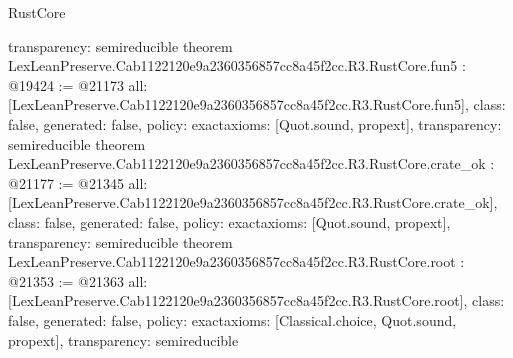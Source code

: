 \begin{lexlean}{RustCore}
\begin{coremodule}
{  transparency: semireducible
}
theorem LexLeanPreserve.Cab1122120e9a2360356857cc8a45f2cc.R3.RustCore.fun5 : @19424 := @21173 {
  all: [LexLeanPreserve.Cab1122120e9a2360356857cc8a45f2cc.R3.RustCore.fun5],
  class: false,
  generated: false,
  policy: exact{axioms: [Quot.sound, propext]},
  transparency: semireducible
}
theorem LexLeanPreserve.Cab1122120e9a2360356857cc8a45f2cc.R3.RustCore.crate_ok : @21177 := @21345 {
  all: [LexLeanPreserve.Cab1122120e9a2360356857cc8a45f2cc.R3.RustCore.crate_ok],
  class: false,
  generated: false,
  policy: exact{axioms: [Quot.sound, propext]},
  transparency: semireducible
}
theorem LexLeanPreserve.Cab1122120e9a2360356857cc8a45f2cc.R3.RustCore.root : @21353 := @21363 {
  all: [LexLeanPreserve.Cab1122120e9a2360356857cc8a45f2cc.R3.RustCore.root],
  class: false,
  generated: false,
  policy: exact{axioms: [Classical.choice, Quot.sound, propext]},
  transparency: semireducible
}


\end{coremodule}
\end{lexlean}
